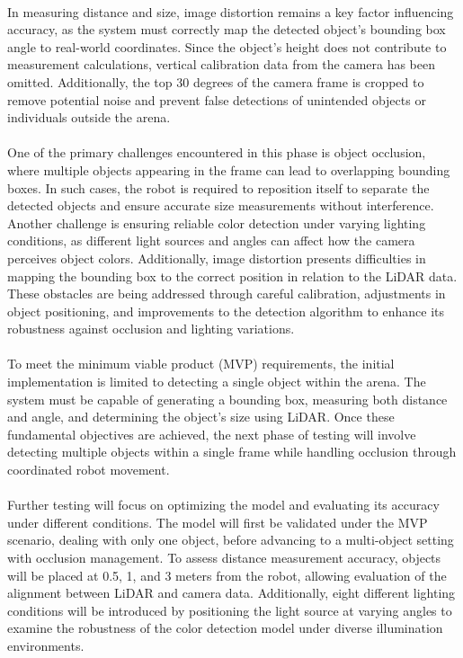 \paragraph*{}
In measuring distance and size, image distortion remains a key factor influencing accuracy, as the system must correctly map the detected object’s bounding box angle to real-world coordinates. Since the object’s height does not contribute to measurement calculations, vertical calibration data from the camera has been omitted. Additionally, the top 30 degrees of the camera frame is cropped to remove potential noise and prevent false detections of unintended objects or individuals outside the arena.

\paragraph*{}
One of the primary challenges encountered in this phase is object occlusion, where multiple objects appearing in the frame can lead to overlapping bounding boxes. In such cases, the robot is required to reposition itself to separate the detected objects and ensure accurate size measurements without interference. Another challenge is ensuring reliable color detection under varying lighting conditions, as different light sources and angles can affect how the camera perceives object colors. Additionally, image distortion presents difficulties in mapping the bounding box to the correct position in relation to the LiDAR data. These obstacles are being addressed through careful calibration, adjustments in object positioning, and improvements to the detection algorithm to enhance its robustness against occlusion and lighting variations.

\paragraph*{}
To meet the minimum viable product (MVP) requirements, the initial implementation is limited to detecting a single object within the arena. The system must be capable of generating a bounding box, measuring both distance and angle, and determining the object's size using LiDAR. Once these fundamental objectives are achieved, the next phase of testing will involve detecting multiple objects within a single frame while handling occlusion through coordinated robot movement.

\paragraph*{}
Further testing will focus on optimizing the model and evaluating its accuracy under different conditions. The model will first be validated under the MVP scenario, dealing with only one object, before advancing to a multi-object setting with occlusion management. To assess distance measurement accuracy, objects will be placed at 0.5, 1, and 3 meters from the robot, allowing evaluation of the alignment between LiDAR and camera data. Additionally, eight different lighting conditions will be introduced by positioning the light source at varying angles to examine the robustness of the color detection model under diverse illumination environments.
